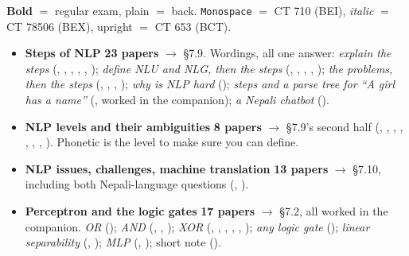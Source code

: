 \hr


{\color{sub}\footnotesize \textbf{Bold} $=$ regular exam, plain $=$ back.
\texttt{Monospace} $=$ CT 710 (BEI), \textit{italic} $=$ CT 78506 (BEX), upright $=$
CT 653 (BCT).}

\begin{itemize}
  \item \textbf{Steps of NLP} \textbf{23 papers} $\rightarrow$ \S7.9. Wordings, all one
        answer: \emph{explain the steps} (, , ,
        , , );
        \emph{define NLU and NLG, then the steps} (,
        , , ,
        ); \emph{the problems, then the steps} (,
        , , );
        \emph{why is NLP hard} (); \emph{steps and a parse tree for ``A girl
        has a name''} (, worked in the companion);
        \emph{a Nepali chatbot} ().
  \item \textbf{NLP levels and their ambiguities} \textbf{8 papers} $\rightarrow$
        \S7.9's second half (, ,
        , , ,
        , , ).
        Phonetic is the level to make sure you can define.
  \item \textbf{NLP issues, challenges, machine translation} \textbf{13 papers}
        $\rightarrow$ \S7.10, including both Nepali-language questions
        (, ).
  \item \textbf{Perceptron and the logic gates} \textbf{17 papers} $\rightarrow$ \S7.2,
        all worked in the companion. \emph{OR} (); \emph{AND}
        (, , );
        \emph{XOR} (, , ,
        , , );
        \emph{any logic gate} (); \emph{linear separability}
        (, ); \emph{MLP}
        (, ); short note ().

\end{itemize}
